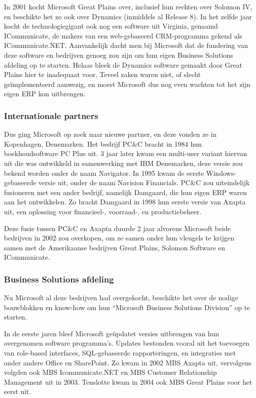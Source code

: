 In 2001 kocht Microsoft Great Plains over, inclusief hun rechten over Solomon IV, en beschikte het zo ook over Dynamics (inmiddels al Release 8). In het zelfde jaar kocht de technologiegigant ook nog een software uit Virginia, genaamd ICommunicate, de makers van een web-gebaseerd CRM-programma gekend als ICommunicate.NET. Aanvankelijk dacht men bij Microsoft dat de fundering van deze software en bedrijven genoeg zou zijn om hun eigen Business Solutions afdeling op te starten. Helaas bleek de Dynamics software gemaakt door Great Plains hier te inadequaat voor. Teveel zaken waren niet, of slecht geïmplementeerd aanwezig, en moest Microsoft dus nog even wachten tot het zijn eigen ERP kon uitbrengen. 

\subsubsection{Internationale partners }
Dus ging Microsoft op zoek naar nieuwe partner, en deze vonden ze in Kopenhagen, Denemarken. Het bedrijf PC\&C bracht in 1984 hun boekhoudsoftware PC Plus uit. 3 jaar later kwam een multi-user variant hiervan uit die was ontwikkeld in samenwerking met IBM Denemarken, deze versie zou bekend worden onder de naam Navigator. In 1995 kwam de eerste Windows-gebaseerde versie uit, onder de naam Navision Financials. PC\&C zou uiteindelijk fusioneren met een ander bedrijf, namelijk Damgaard, die hun eigen ERP waren aan het ontwikkelen. Zo bracht Damgaard in 1998 hun eerste versie van Axapta uit, een oplossing voor financieel-, voorraad-, en productiebeheer.

Deze fusie tussen PC\&C en Axapta duurde 2 jaar alvorens Microsoft beide bedrijven in 2002 zou overkopen, om ze samen onder hun vleugels te krijgen samen met de Amerikaanse bedrijven Great Plains,  Solomon Software en ICommunicate. 

\subsubsection{Business Solutions afdeling}
Nu Microsoft al deze bedrijven had overgekocht, beschikte het over de nodige bouwblokken en know-how om hun “Microsoft Business Solutions Division” op te starten. 

In de eerste jaren bleef Microsoft geüpdatet versies uitbrengen van hun overgenomen software programma’s. Updates bestonden vooral uit het toevoegen van role-based interfaces, SQL-gebaseerde rapporteringen, en integraties met onder andere Office en SharePoint.  Zo kwam in 2002 MBS Axapta uit, vervolgens volgden ook MBS Icommunicate.NET en MBS Customer Relationship Management uit in 2003. Tenslotte kwam in 2004 ook MBS Great Plains voor het eerst uit. 

